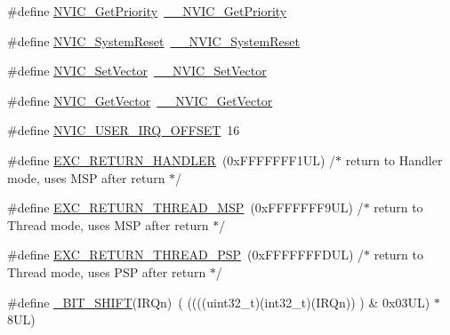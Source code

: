 \begin{DoxyCompactItemize}
\item 
\#define \hyperlink{group___c_m_s_i_s___core___n_v_i_c_functions_gaf59b9d0a791d2157abb319753953eceb}{N\+V\+I\+C\+\_\+\+Get\+Priority}~\hyperlink{group___c_m_s_i_s___core___n_v_i_c_functions_gaeb9dc99c8e7700668813144261b0bc73}{\+\_\+\+\_\+\+N\+V\+I\+C\+\_\+\+Get\+Priority}
\item 
\#define \hyperlink{group___c_m_s_i_s___core___n_v_i_c_functions_ga6aa0367d3642575610476bf0366f0c48}{N\+V\+I\+C\+\_\+\+System\+Reset}~\hyperlink{group___c_m_s_i_s___core___n_v_i_c_functions_ga0d9aa2d30fa54b41eb780c16e35b676c}{\+\_\+\+\_\+\+N\+V\+I\+C\+\_\+\+System\+Reset}
\item 
\#define \hyperlink{group___c_m_s_i_s___core___n_v_i_c_functions_ga804af63bb4c4c317387897431814775d}{N\+V\+I\+C\+\_\+\+Set\+Vector}~\hyperlink{group___c_m_s_i_s___core___n_v_i_c_functions_ga0df355460bc1783d58f9d72ee4884208}{\+\_\+\+\_\+\+N\+V\+I\+C\+\_\+\+Set\+Vector}
\item 
\#define \hyperlink{group___c_m_s_i_s___core___n_v_i_c_functions_ga955eb1c33a3dcc62af11a8385e8c0fc8}{N\+V\+I\+C\+\_\+\+Get\+Vector}~\hyperlink{group___c_m_s_i_s___core___n_v_i_c_functions_ga44b665d2afb708121d9b10c76ff00ee5}{\+\_\+\+\_\+\+N\+V\+I\+C\+\_\+\+Get\+Vector}
\item 
\#define \hyperlink{group___c_m_s_i_s___core___n_v_i_c_functions_ga8045d905a5ca57437d8e6f71ffcb6df5}{N\+V\+I\+C\+\_\+\+U\+S\+E\+R\+\_\+\+I\+R\+Q\+\_\+\+O\+F\+F\+S\+ET}~16
\item 
\#define \hyperlink{group___c_m_s_i_s___core___n_v_i_c_functions_gaa6fa2b10f756385433e08522d9e4632f}{E\+X\+C\+\_\+\+R\+E\+T\+U\+R\+N\+\_\+\+H\+A\+N\+D\+L\+ER}~(0x\+F\+F\+F\+F\+F\+F\+F1\+U\+L)     /$\ast$ return to Handler mode, uses M\+S\+P after return                               $\ast$/
\item 
\#define \hyperlink{group___c_m_s_i_s___core___n_v_i_c_functions_gaea4703101b5e679f695e231f7ee72331}{E\+X\+C\+\_\+\+R\+E\+T\+U\+R\+N\+\_\+\+T\+H\+R\+E\+A\+D\+\_\+\+M\+SP}~(0x\+F\+F\+F\+F\+F\+F\+F9\+U\+L)     /$\ast$ return to Thread mode, uses M\+S\+P after return                                $\ast$/
\item 
\#define \hyperlink{group___c_m_s_i_s___core___n_v_i_c_functions_ga9998daf0fbdf31dbc8f81cd604b58175}{E\+X\+C\+\_\+\+R\+E\+T\+U\+R\+N\+\_\+\+T\+H\+R\+E\+A\+D\+\_\+\+P\+SP}~(0x\+F\+F\+F\+F\+F\+F\+F\+D\+U\+L)     /$\ast$ return to Thread mode, uses P\+S\+P after return                                $\ast$/
\item 
\#define \hyperlink{group___c_m_s_i_s___core___n_v_i_c_functions_ga53c75b28823441c6153269f0ecbed878}{\+\_\+\+B\+I\+T\+\_\+\+S\+H\+I\+FT}(I\+R\+Qn)~(  ((((uint32\+\_\+t)(int32\+\_\+t)(I\+R\+Qn))         )      \&  0x03\+U\+L) $\ast$ 8\+U\+L)

\end{DoxyCompactItemize}

